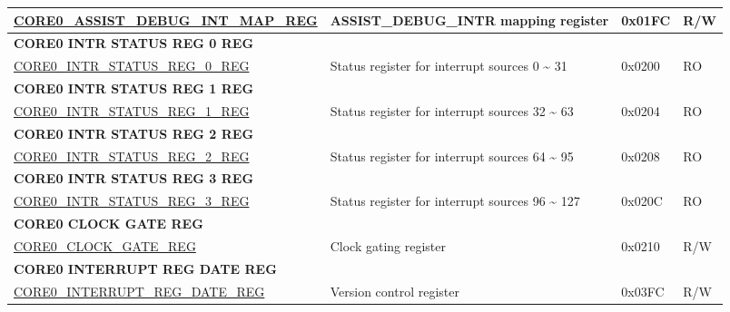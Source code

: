 \begin{longtable}{ | p{7.5cm} | p{7.2cm} | p{1.3cm} | p{1cm} | }
\hyperref[regdesc:CORE0ASSISTDEBUGINTMAPREG]{CORE0\_ASSIST\_DEBUG\_INT\_MAP\_REG} & ASSIST\_DEBUG\_INTR mapping register & 0x01FC & R/W \\ \hline
\multicolumn{4}{|l|}{\textbf{CORE0 INTR STATUS REG 0 REG}} \\ \hline
\hyperref[regdesc:CORE0INTRSTATUSREG0REG]{CORE0\_INTR\_STATUS\_REG\_0\_REG} & Status register for interrupt sources 0 \~{} 31 & 0x0200 & RO \\ \hline
\multicolumn{4}{|l|}{\textbf{CORE0 INTR STATUS REG 1 REG}} \\ \hline
\hyperref[regdesc:CORE0INTRSTATUSREG1REG]{CORE0\_INTR\_STATUS\_REG\_1\_REG} & Status register for interrupt sources 32 \~{} 63 & 0x0204 & RO \\ \hline
\multicolumn{4}{|l|}{\textbf{CORE0 INTR STATUS REG 2 REG}} \\ \hline
\hyperref[regdesc:CORE0INTRSTATUSREG2REG]{CORE0\_INTR\_STATUS\_REG\_2\_REG} & Status register for interrupt sources 64 \~{} 95 & 0x0208 & RO \\ \hline
\multicolumn{4}{|l|}{\textbf{CORE0 INTR STATUS REG 3 REG}} \\ \hline
\hyperref[regdesc:CORE0INTRSTATUSREG3REG]{CORE0\_INTR\_STATUS\_REG\_3\_REG} & Status register for interrupt sources 96 \~{} 127 & 0x020C & RO \\ \hline
\multicolumn{4}{|l|}{\textbf{CORE0 CLOCK GATE REG}} \\ \hline
\hyperref[regdesc:CORE0CLOCKGATEREG]{CORE0\_CLOCK\_GATE\_REG} & Clock gating register & 0x0210 & R/W \\ \hline
\multicolumn{4}{|l|}{\textbf{CORE0 INTERRUPT REG DATE REG}} \\ \hline
\hyperref[regdesc:CORE0INTERRUPTREGDATEREG]{CORE0\_INTERRUPT\_REG\_DATE\_REG} & Version control register & 0x03FC & R/W \\ \hline
\end{longtable}
